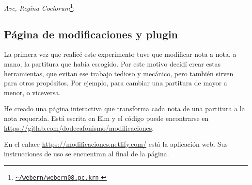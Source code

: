 	\textit{Ave, Regina Coelorum}\footnote{\href{http://www.ccarh.org/publications/data/humdrum/tonerow/files/webern/webern08.pc.krn}{ \texttt{\textasciitilde/webern/webern08.pc.krn} }}: \hfill
    
    \subsection{Página de modificaciones y plugin}
	
	La primera vez que realicé este experimento tuve que modificar nota a nota, a mano, la partitura que había escogido. Por este motivo decidí crear estas herramientas, que evitan ese trabajo tedioso y mecánico, pero también sirven para otros propósitos. Por ejemplo, para cambiar una partitura de mayor a menor, o viceversa.
	
    He creado una página interactiva que transforma cada nota de una partitura a la nota requerida. Está escrita en Elm y el código puede encontrarse en \url{https://gitlab.com/dodecafonismo/modificaciones}.  	
    	
   	En el enlace \url{https://modificaciones.netlify.com/} está la aplicación web. Sus instrucciones de uso se encuentran al final de la página.
    
